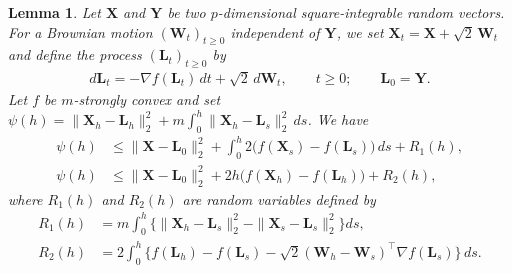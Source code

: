 \documentclass[aos,reqno]{imsart}
\newcommand\bL{\boldsymbol L}
\newcommand\bY{\boldsymbol Y}
\newcommand\bX{\boldsymbol X}
\newcommand\bW{\boldsymbol W}
\newtheorem{lemma}{Lemma}
\theoremstyle{definition}
\begin{document}
\begin{lemma}\label{lem:1c}
    Let $\bX$ and\/ $\bY$ be two $p$-dimensional 
    square-integrable random vectors. For a Brownian 
    motion $(\bW_t)_{t\geqslant 0}$ independent 
    of\/ $\bY$, we set $\bX_t = \bX+\sqrt{2}\,\bW_t$ 
    and define the process $(\bL_t)_{t\geqslant 0}$ by 
    \begin{align}\label{LD}
        d\bL_t = -\nabla f(\bL_t)\,dt + \sqrt{2}\,
        d\bW_t,\qquad t\geqslant 0;\qquad \bL_0 = \bY. 
    \end{align}
    Let $f$ be $m$-strongly convex and set $\psi(h) = \| 
    \bX_h-\bL_h\|_2^2 + m\int_0^h\|\bX_h-\bL_s\|_2^2\,ds$.
    We have
    \begin{align}
        \psi(h)  &\leqslant 
        \|\bX -\bL_0\|_2^2 + \int_0^h2\big(f(\bX_s) 
        - f(\bL_s)\big)\,ds + R_1(h),\label{eq:7}\\
        \psi(h) 
        &\leqslant \|\bX -\bL_0\|_2^2 + 2h\big(f(\bX_h) 
        - f(\bL_h) \big) + R_2(h),\label{eq:7b}
    \end{align}
    where $R_1(h)$ and $R_2(h)$ are random variables defined by
    \begin{align}
        R_1(h) &= m\int_0^h\big\{\|\bX_h-\bL_s\|_2^2 - 
        \|\bX_s-\bL_s\|_2^2\big\}ds,\\
        R_2(h) &= 2\int_0^h \big\{ f(\bL_h) - f(\bL_s) - 
        \sqrt{2}(\bW_h-\bW_s)^\top\nabla f(\bL_s)\big\}\,ds.
    \end{align}
\end{lemma}
\end{document}
